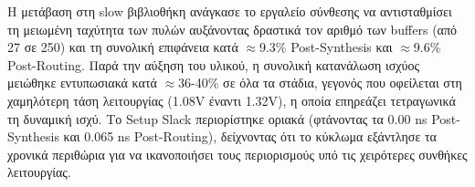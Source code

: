 Η μετάβαση στη slow βιβλιοθήκη ανάγκασε το εργαλείο σύνθεσης να αντισταθμίσει τη μειωμένη ταχύτητα των πυλών αυξάνοντας δραστικά τον αριθμό των buffers (από 27 σε 250) και τη συνολική επιφάνεια κατά $\approx$9.3\% Post-Synthesis και $\approx$9.6\% Post-Routing. Παρά την αύξηση του υλικού, η συνολική κατανάλωση ισχύος μειώθηκε εντυπωσιακά κατά $\approx$36-40\% σε όλα τα στάδια, γεγονός που οφείλεται στη χαμηλότερη τάση λειτουργίας (1.08V έναντι 1.32V), η οποία επηρεάζει τετραγωνικά τη δυναμική ισχύ. Το Setup Slack περιορίστηκε οριακά (φτάνοντας τα 0.00 ns Post-Synthesis και 0.065 ns Post-Routing), δείχνοντας ότι το κύκλωμα εξάντλησε τα χρονικά περιθώρια για να ικανοποιήσει τους περιορισμούς υπό τις χειρότερες συνθήκες λειτουργίας.